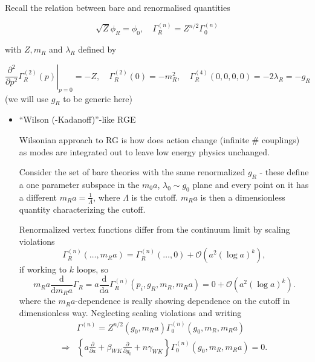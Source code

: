 Recall the relation between bare and renormalised quantities

\begin{equation}
\sqrt{Z} \phi_{R}=\phi_{0}, \quad \Gamma_{R}^{(n)}=Z^{n / 2} \Gamma_{0}^{(n)}
\end{equation}

with \(Z, m_{R}\) and \(\lambda_{R}\) defined by

\begin{equation}
\left.\frac{\partial^{2}}{\partial p^{2}} \Gamma_{R}^{(2)}(p)\right|_{p=0}=-Z, \quad \Gamma_{R}^{(2)}(0)=-m_{R}^{2}, \quad \Gamma_{R}^{(4)}(0,0,0,0)=-2 \lambda_{R}=-g_{R}
\end{equation}
(we will use $g_R$ to be generic here)
\begin{itemize}
  \item ``Wilson (-Kadanoff)''-like RGE

Wilsonian approach to RG is how does action change (infinite \# couplings) as modes are integrated out to leave low energy physics unchanged.

Consider the set of bare theories with the same renormalized $g_R$ - these define a one parameter subspace in the $m_0 a$, $\lambda_0 \sim g_0$ plane and every point on it has a different $m_R a = \frac{1}{\Lambda}$, where $\Lambda$ is the cutoff. $m_R a$ is then a dimensionless quantity characterizing the cutoff.

Renormalized vertex functions differ from the continuum limit by scaling violations
\begin{equation}
    \Gamma_R^{(n)} (\ldots, m_R a) = \Gamma_R^{(n)}(\ldots, 0) + \mathcal{O}(a^2 (\log a)^k),
\end{equation}
if working to $k$ loops, so 
\begin{equation}
    m_R a \frac{\text{d}}{\text{d} m_R a} \Gamma_R = a \frac{\text{d}}{\text{d}a} \Gamma_R^{(n)}(p_i, g_R, m_R, m_Ra) = 0 + \mathcal{O}(a^2 (\log a)^k).
\end{equation}
where the $m_Ra$-dependence is really showing dependence on the cutoff in dimensionless way.
Neglecting scaling violations and writing
\begin{align}
    &\Gamma^{(n)} = Z^{n/2}(g_0, m_Ra)\Gamma_0^{(n)}(g_0, m_R, m_R a) \nonumber \\
    \Rightarrow &\left\{a \frac{\partial}{\partial a} + \beta_{WK} \frac{\partial}{\partial g_0} + n \gamma_{WK} \right\} \Gamma_0^{(n)}(g_0, m_R, m_R a) = 0.
\end{align}


\end{itemize}

